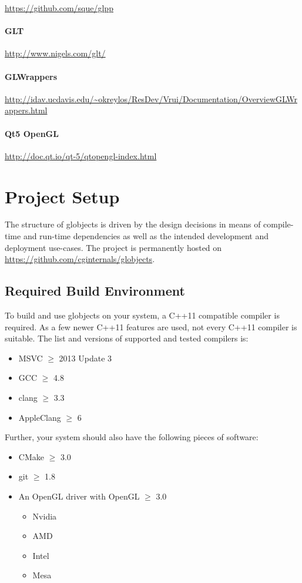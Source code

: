 \documentclass{article}
\begin{document}
\url{https://github.com/sque/glpp}

\paragraph{GLT}

\url{http://www.nigels.com/glt/}

\paragraph{GLWrappers}

\url{http://idav.ucdavis.edu/~okreylos/ResDev/Vrui/Documentation/OverviewGLWrappers.html}

\paragraph{Qt5 OpenGL}

\url{http://doc.qt.io/qt-5/qtopengl-index.html}

\section{Project Setup}

The structure of globjects is driven by the design decisions in means of compile-time and run-time dependencies as well as the intended development and deployment use-cases. The project is permanently hosted on \url{https://github.com/cginternals/globjects}.

\subsection{Required Build Environment}

To build and use globjects on your system, a C++11 compatible compiler is required. As a few newer C++11 features are used, not every C++11 compiler is suitable. The list and versions of supported and tested compilers is:
\begin{itemize}
	\item MSVC $\geq$ 2013 Update 3
	\item GCC  $\geq$ 4.8
	\item clang $\geq$ 3.3
	\item AppleClang $\geq$ 6
\end{itemize}
Further, your system should also have the following pieces of software:
\begin{itemize}
	\item CMake $\geq$ 3.0
	\item git $\geq$ 1.8
	\item An OpenGL driver with OpenGL $\geq$ 3.0
	\begin{itemize}
		\item Nvidia
		\item AMD
		\item Intel
		\item Mesa
	\end{itemize}
\end{itemize}
\end{document}
